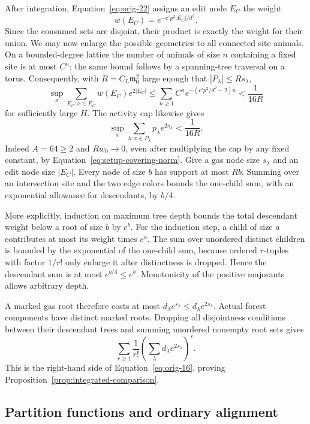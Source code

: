 After integration, Equation~\eqref{eq:orig-22} assigns an edit node
$E_C$ the weight
\[
 w(E_C)=e^{-c'p^2|E_C|/d^2}.
\]
Since the consumed sets are disjoint, their product is exactly the
weight for their union. We may now enlarge the possible geometries
to all connected site animals. On a bounded-degree lattice the number
of animals of size $n$ containing a fixed site is at most $C^n$;
the same bound follows by a spanning-tree traversal on a torus.
Consequently, with $R=C_L\mathfrak m_0^2$ large enough that
$|P_\lambda|\le Rs_\lambda$,
\[
 \sup_x\sum_{E_C:x\in E_C}w(E_C)e^{2|E_C|}
 \le\sum_{n\ge1}C^ne^{-(c'p^2/d^2-2)n}
 <\frac1{16R}
\]
for sufficiently large $H$. The activity cap likewise gives
\[
 \sup_x\sum_{\lambda:x\in P_\lambda}
                    p_\lambda e^{2s_\lambda}<\frac1{16R}.
\]
Indeed $A=64\ge2$ and $Rw_0\to0$, even after multiplying the cap by
any fixed constant, by Equation~\eqref{eq:setup-covering-norm}.
Give a gas node size $s_\lambda$ and an edit node size $|E_C|$.
Every node of size $b$ has support at most $Rb$. Summing over an
intersection site and the two edge colors bounds the one-child sum,
with an exponential allowance for descendants, by $b/4$.

More explicitly, induction on maximum tree depth bounds the total
descendant weight below a root of size $b$ by $e^b$. For the induction
step, a child of size $a$ contributes at most its weight times $e^a$.
The sum over unordered distinct children is bounded by the
exponential of the one-child sum, because ordered $r$-tuples with
factor $1/r!$ only enlarge it after distinctness is dropped. Hence
the descendant sum is at most $e^{b/4}\le e^b$. Monotonicity of the
positive majorants allows arbitrary depth.

A marked gas root therefore costs at most
$d_\lambda e^{s_\lambda}\le d_\lambda e^{2s_\lambda}$.
Actual forest components have distinct marked roots. Dropping all
disjointness conditions between their descendant trees and summing
unordered nonempty root sets gives
\[
 \sum_{r\ge1}\frac1{r!}
 \left(\sum_\lambda d_\lambda e^{2s_\lambda}\right)^r.
\]
This is the right-hand side of Equation~\eqref{eq:orig-16}, proving
Proposition~\ref{prop:integrated-comparison}.

\subsection{Partition functions and ordinary alignment}

